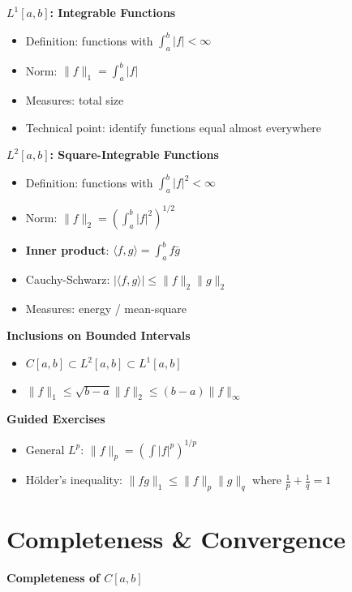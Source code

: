 \documentclass[
  10pt,
  letterpaper,
]{scrbook}
\providecommand{\tightlist}{%
  \setlength{\itemsep}{0pt}\setlength{\parskip}{0pt}}
\begin{document}
\textbf{\(L^1[a,b]\): Integrable Functions}

\begin{itemize}
\tightlist
\item
  Definition: functions with \(\int_a^b |f| < \infty\)
\item
  Norm: \(\|f\|_1 = \int_a^b |f|\)
\item
  Measures: total size
\item
  Technical point: identify functions equal almost everywhere
\end{itemize}

\textbf{\(L^2[a,b]\): Square-Integrable Functions}

\begin{itemize}
\tightlist
\item
  Definition: functions with \(\int_a^b |f|^2 < \infty\)
\item
  Norm: \(\|f\|_2 = \left(\int_a^b |f|^2\right)^{1/2}\)
\item
  \textbf{Inner product}: \(\langle f, g \rangle = \int_a^b f \bar{g}\)
\item
  Cauchy-Schwarz: \(|\langle f, g \rangle| \leq \|f\|_2 \|g\|_2\)
\item
  Measures: energy / mean-square
\end{itemize}

\textbf{Inclusions on Bounded Intervals}

\begin{itemize}
\tightlist
\item
  \(C[a,b] \subset L^2[a,b] \subset L^1[a,b]\)
\item
  \(\|f\|_1 \leq \sqrt{b-a} \|f\|_2 \leq (b-a) \|f\|_\infty\)
\end{itemize}

\textbf{Guided Exercises}

\begin{itemize}
\tightlist
\item
  General \(L^p\): \(\|f\|_p = \left(\int |f|^p\right)^{1/p}\)
\item
  Hölder's inequality: \(\|fg\|_1 \leq \|f\|_p \|g\|_q\) where
  \(\frac{1}{p} + \frac{1}{q} = 1\)
\end{itemize}

\section{Completeness \& Convergence}\label{completeness-convergence}

\textbf{Completeness of \(C[a,b]\)}
\end{document}
